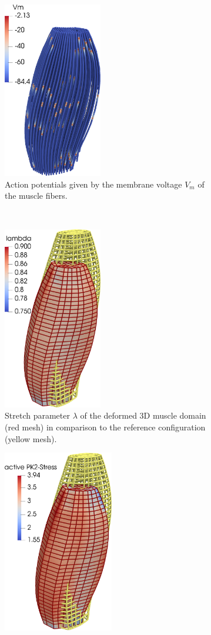 \begin{figure}
  \centering%
  \begin{subfigure}[t]{0.31\textwidth}%
    \centering%
    \includegraphics[height=77mm]{images/results/application/contraction_fibers.png}%
    \caption{Action potentials given by the membrane voltage $V_m$ of the muscle fibers.}%
    \label{fig:contraction_fibers}%
  \end{subfigure}\,
  \begin{subfigure}[t]{0.31\textwidth}%
    \centering%
    \includegraphics[height=8cm]{images/results/application/contraction_lambda.png}%
    \caption{Stretch parameter $\lambda$ of the deformed 3D muscle domain (red mesh) in comparison to the reference configuration (yellow mesh).}%
    \label{fig:contraction_lambda}%
  \end{subfigure}
  \begin{subfigure}[t]{0.31\textwidth}%
    \centering%
    \includegraphics[height=8cm]{images/results/application/contraction_active_stress.png}%

\end{subfigure}
\end{figure}
